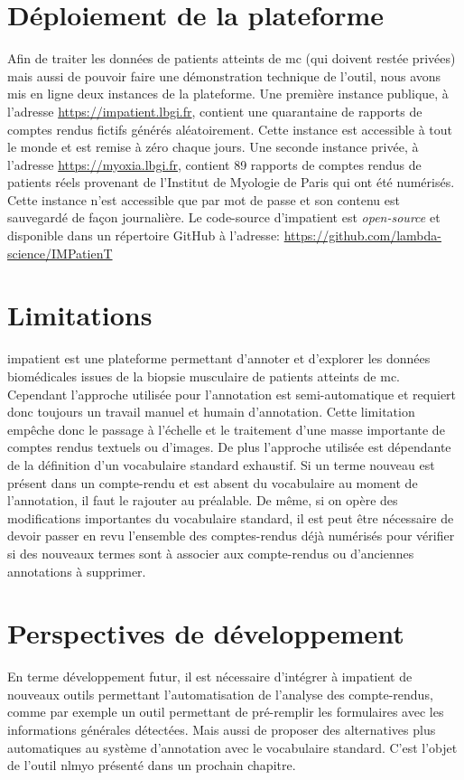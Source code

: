 \section{Déploiement de la plateforme}
Afin de traiter les données de patients atteints de \gls{mc} (qui doivent restée privées) mais aussi de pouvoir faire une démonstration technique de l'outil, nous avons mis en ligne deux instances de la plateforme. Une première instance publique, à l'adresse \href{https://impatient.lbgi.fr}{https://impatient.lbgi.fr}, contient une quarantaine de rapports de comptes rendus fictifs générés aléatoirement. Cette instance est accessible à tout le monde et est remise à zéro chaque jours. Une seconde instance privée, à l'adresse \href{https://myoxia.lbgi.fr}{https://myoxia.lbgi.fr}, contient 89 rapports de comptes rendus de patients réels provenant de l'Institut de Myologie de Paris qui ont été numérisés. Cette instance n'est accessible que par mot de passe et son contenu est sauvegardé de façon journalière. Le code-source d'\gls{impatient} est \textit{open-source} et disponible dans un répertoire GitHub à l'adresse: \href{https://github.com/lambda-science/IMPatienT}{https://github.com/lambda-science/IMPatienT}
\section{Limitations}
\gls{impatient} est une plateforme permettant d'annoter et d'explorer les données biomédicales issues de la biopsie musculaire de patients atteints de \gls{mc}. Cependant l'approche utilisée pour l'annotation est semi-automatique et requiert donc toujours un travail manuel et humain d'annotation. Cette limitation empêche donc le passage à l'échelle et le traitement d'une masse importante de comptes rendus textuels ou d'images. De plus l'approche utilisée est dépendante de la définition d'un vocabulaire standard exhaustif. Si un terme nouveau est présent dans un compte-rendu et est absent du vocabulaire au moment de l'annotation, il faut le rajouter au préalable. De même, si on opère des modifications importantes du vocabulaire standard, il est peut être nécessaire de devoir passer en revu l'ensemble des comptes-rendus déjà numérisés pour vérifier si des nouveaux termes sont à associer aux compte-rendus ou d'anciennes annotations à supprimer.
\section{Perspectives de développement}
En terme développement futur, il est nécessaire d'intégrer à \gls{impatient}  de nouveaux outils permettant l'automatisation de l'analyse des compte-rendus, comme par exemple un outil permettant de pré-remplir les formulaires avec les informations générales détectées. Mais aussi de proposer des alternatives plus automatiques au système d'annotation avec le vocabulaire standard. C'est l'objet de l'outil \gls{nlmyo} présenté dans un prochain chapitre.

